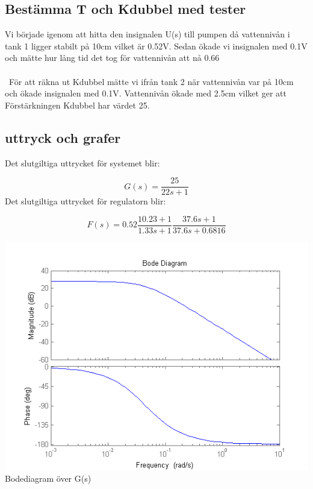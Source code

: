 \documentclass[a4paper]{article}
\begin{document}
\subsection{Bestämma T och Kdubbel med tester}
Vi började igenom att hitta den insignalen U(s) till pumpen då vattennivån i tank 1 ligger stabilt på 10cm vilket är 0.52V. Sedan ökade vi insignalen med 0.1V och mätte hur lång tid det tog för vattennivån att nå 0.66%
\\\\\
För att räkna ut Kdubbel mätte vi ifrån tank 2 när vattennivån var på 10cm och ökade insignalen med 0.1V. Vattennivån ökade med 2.5cm vilket ger att Förstärkningen Kdubbel har värdet 25.

\subsection{uttryck och grafer}
Det slutgiltiga uttrycket för systemet blir:

\begin{equation*}
  G(s)=\frac{25}{22s+1}
\end{equation*}
Det slutgiltiga uttrycket för regulatorn blir:

\begin{equation*}
  F(s)=0.52\frac{10.23+1}{1.33s+1} \frac{37.6s+1}{37.6s+0.6816}
\end{equation*}

\includegraphics[scale=1]{bodeG}
Bodediagram över G(s)
\end{document}

